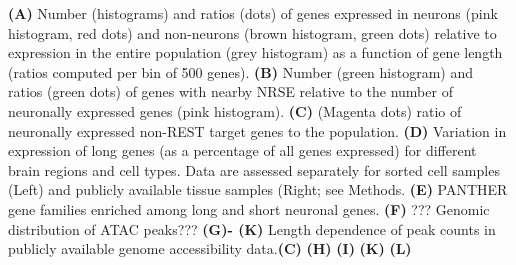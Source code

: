\textbf{(A)} Number (histograms) and ratios (dots) of genes expressed in neurons (pink histogram, red dots) and non-neurons (brown histogram, green dots) relative to expression in the entire population (grey histogram) as a function of gene length (ratios computed per bin of 500 genes). 
\textbf{(B)} Number (green histogram) and ratios (green dots) of genes with nearby NRSE relative to the number of neuronally expressed genes (pink histogram). 
\textbf{(C)} (Magenta dots) ratio of neuronally expressed non-REST target genes to the population.
\textbf{(D)} Variation in expression of long genes (as a percentage of all genes expressed) for different brain regions and cell types. Data are assessed separately for sorted cell samples (Left) and publicly available tissue samples (Right; see Methods.
\textbf{(E)} PANTHER gene families enriched among long and short neuronal genes. 
\textbf{(F)} ??? Genomic distribution of ATAC peaks???
\textbf{(G)- (K)} Length dependence of peak counts in publicly available genome accessibility data.\textbf{(C)}
\textbf{(H)}
\textbf{(I)}
\textbf{(K)}
\textbf{(L)}